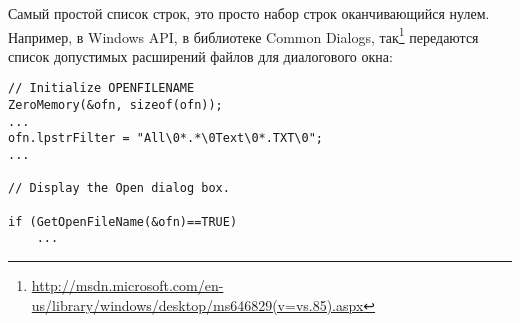 Самый простой список строк, это просто набор строк оканчивающийся нулем.
Например, в Windows API, в библиотеке Common Dialogs, 
так\footnote{\url{http://msdn.microsoft.com/en-us/library/windows/desktop/ms646829(v=vs.85).aspx}} 
передаются список допустимых расширений файлов для диалогового окна:

\begin{lstlisting}
// Initialize OPENFILENAME
ZeroMemory(&ofn, sizeof(ofn));
...
ofn.lpstrFilter = "All\0*.*\0Text\0*.TXT\0";
...

// Display the Open dialog box. 

if (GetOpenFileName(&ofn)==TRUE) 
	...
\end{lstlisting}

